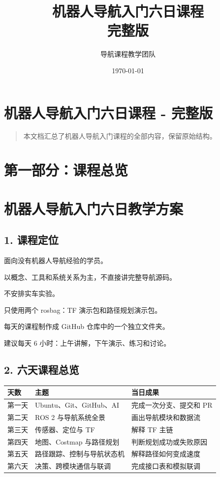 \documentclass[a4paper,12pt]{book}
\title{\Huge\textbf{机器人导航入门六日课程}\\[0.5cm]\Large 完整版}
\author{导航课程教学团队}
\date{\today}
\begin{document}
\maketitle
\tableofcontents
\newpage

\chapter{机器人导航入门六日课程 - 完整版}

\begin{quote}本文档汇总了机器人导航入门课程的全部内容，保留原始结构。\end{quote}

\hrulefill


\chapter{第一部分：课程总览}

\chapter{机器人导航入门六日教学方案}

\section{1. 课程定位}

\item 面向没有机器人导航经验的学员。
\item 以概念、工具和系统关系为主，不直接讲完整导航源码。
\item 不安排实车实验。
\item 只使用两个 rosbag：TF 演示包和路径规划演示包。
\item 每天的课程制作成 GitHub 仓库中的一个独立文件夹。
\item 建议每天 6 小时：上午讲解，下午演示、练习和讨论。

\section{2. 六天课程总览}

\begin{table}[h]
\centering
\begin{tabular}{|l|l|l|}
\hline
天数 & 主题 & 当日成果 \\
\hline
第一天 & Ubuntu、Git、GitHub、AI & 完成一次分支、提交和 PR \\
\hline
第二天 & ROS 2 与导航系统全景 & 画出导航模块和数据流 \\
\hline
第三天 & 传感器、定位与 TF & 解释 TF 主链 \\
\hline
第四天 & 地图、Costmap 与路径规划 & 判断规划成功或失败原因 \\
\hline
第五天 & 路径跟踪、控制与导航状态机 & 解释路径如何变成速度 \\
\hline
第六天 & 决策、跨模块通信与联调 & 完成接口表和模拟联调 \\
\hline
\end{tabular}
\end{table}
\end{document}
